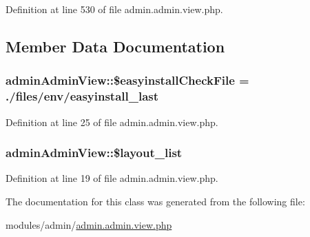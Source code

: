 Definition at line 530 of file admin.\+admin.\+view.\+php.



\subsection{Member Data Documentation}
\hypertarget{classadminAdminView_a3cfff18fed688e8cf67f4f8bbba79abf}{}
\subsubsection[{\$easyinstall\+Check\+File}]{\setlength{\rightskip}{0pt plus 5cm}admin\+Admin\+View\+::\$easyinstall\+Check\+File = \textquotesingle{}./files/env/easyinstall\+\_\+last\textquotesingle{}}\label{classadminAdminView_a3cfff18fed688e8cf67f4f8bbba79abf}


Definition at line 25 of file admin.\+admin.\+view.\+php.

\hypertarget{classadminAdminView_a3655428ad4a88938daaa0a44c1ff96ea}{}
\subsubsection[{\$layout\+\_\+list}]{\setlength{\rightskip}{0pt plus 5cm}admin\+Admin\+View\+::\$layout\+\_\+list}\label{classadminAdminView_a3655428ad4a88938daaa0a44c1ff96ea}


Definition at line 19 of file admin.\+admin.\+view.\+php.



The documentation for this class was generated from the following file\+:\begin{DoxyCompactItemize}
\item 
modules/admin/\hyperlink{admin_8admin_8view_8php}{admin.\+admin.\+view.\+php}\end{DoxyCompactItemize}
